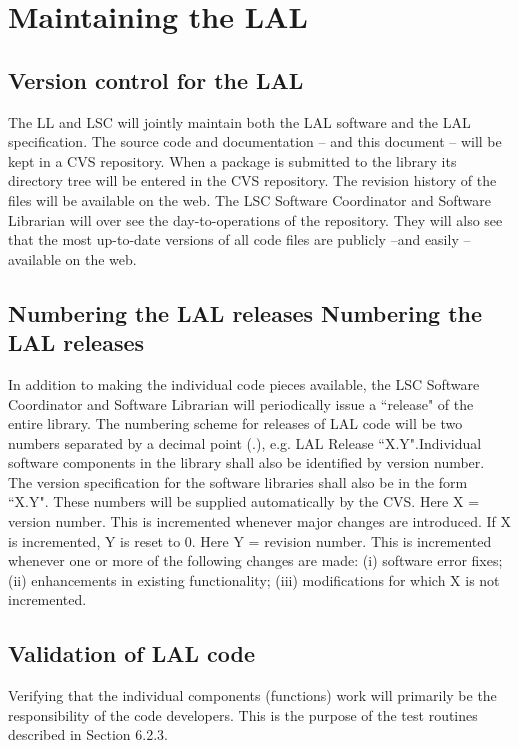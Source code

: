 \documentclass[]{ligodcc}
\begin{document}
\section{Maintaining the LAL}
\label{sec:lalmaint}

\subsection{Version control for the LAL}

The LL and LSC will jointly maintain both the LAL software and the LAL
specification. The source code and documentation -- and this document
-- will be kept in a CVS repository. When a package is submitted to
the library its directory tree will be entered in the CVS repository.
The revision history of the files will be available on the web. The
LSC Software Coordinator and Software Librarian will over see the
day-to-operations of the repository. They will also see that the  most
up-to-date versions of all code files are  publicly --and easily --
available on the web.

\subsection{Numbering the LAL releases Numbering the LAL releases}

In addition to making the individual code pieces available, the LSC
Software Coordinator and Software Librarian will periodically issue a
``release" of the entire library. The numbering scheme for releases of
LAL code will be two numbers separated by a decimal point (.), e.g.
LAL Release ``X.Y".Individual software components in the library shall
also be identified by version number.  The version specification for
the software libraries shall also be in the form ``X.Y". These numbers
will be supplied automatically by the CVS. Here X = version number.
This is incremented whenever major changes are introduced. If X is
incremented, Y is reset to 0. Here Y = revision number. This is
incremented whenever one or more of the following changes are made:
(i) software error fixes; (ii) enhancements in existing
functionality; (iii) modifications for which  X is not incremented.

\subsection{Validation of LAL code}

Verifying that the individual components (functions) work will
primarily be the responsibility of the code developers.  This is the
purpose of the test routines described in Section 6.2.3.
\end{document}
